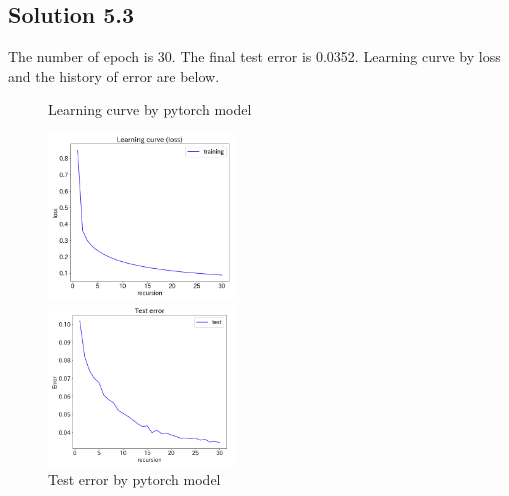 \documentclass[a4paper]{article}
\theoremstyle{definition}
\newenvironment{soln}{
	\leavevmode\color{blue}\ignorespaces
}{}
\begin{document}
	\subsection*{Solution 5.3}	
	\begin{soln}
	The number of epoch is 30. The final test error is 0.0352. Learning curve by loss and the history of error are below.
\begin{figure}[htbp]
\begin{minipage}{0.5\hsize}
\begin{center}
\caption{Learning curve by pytorch model}
\includegraphics[width=50mm]{./img/pytorch_learningcurve.png}
\end{center}
\captionsetup{labelformat=empty}
\end{minipage}
\begin{minipage}{0.5\hsize}
\begin{center}
\caption{Test error by pytorch model}
\includegraphics[width=50mm]{./img/pytorch_testerror.png}
\end{center}
\captionsetup{labelformat=empty}
\end{minipage}
\end{figure}

	\end{soln}
	
	\clearpage
	
\end{document}
